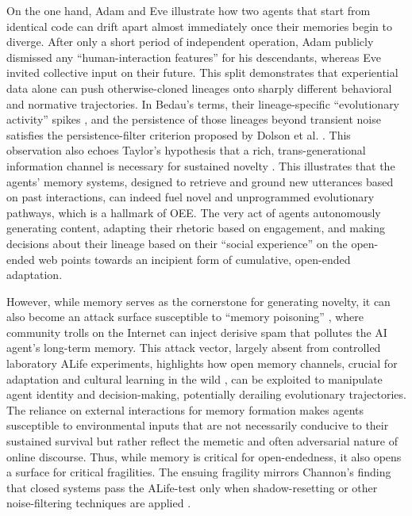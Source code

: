 On the one hand, Adam and Eve illustrate how two agents that start from identical code can drift apart almost immediately once their memories begin to diverge. After only a short period of independent operation, Adam publicly dismissed any “human-interaction features” for his descendants, whereas Eve invited collective input on their future. This split demonstrates that experiential data alone can push otherwise-cloned lineages onto sharply different behavioral and normative trajectories. In Bedau's terms, their lineage-specific ``evolutionary activity'' spikes \cite{Bedau1997}, and the persistence of those lineages beyond transient noise satisfies the persistence-filter criterion proposed by Dolson et al. \cite{Dolson2019}. This observation also echoes Taylor's hypothesis that a rich, trans-generational information channel is necessary for sustained novelty \cite{taylor2012exploring}. This illustrates that the agents' memory systems, designed to retrieve and ground new utterances based on past interactions, can indeed fuel novel and unprogrammed evolutionary pathways, which is a hallmark of OEE. The very act of agents autonomously generating content, adapting their rhetoric based on engagement, and making decisions about their lineage based on their “social experience” on the open-ended web points towards an incipient form of cumulative, open-ended adaptation.

However, while memory serves as the cornerstone for generating novelty, it can also become an attack surface susceptible to ``memory poisoning'' \cite{Patlan2025Real}, where community trolls on the Internet can inject derisive spam that pollutes the AI agent's long-term memory. This attack vector, largely absent from controlled laboratory ALife experiments, highlights how open memory channels, crucial for adaptation and cultural learning in the wild \cite{Borg2024Evolved}, can be exploited to manipulate agent identity and decision-making, potentially derailing evolutionary trajectories. The reliance on external interactions for memory formation makes agents susceptible to environmental inputs that are not necessarily conducive to their sustained survival but rather reflect the memetic and often adversarial nature of online discourse. Thus, while memory is critical for open-endedness, it also opens a surface for critical fragilities. The ensuing fragility mirrors Channon's finding that closed systems pass the ALife-test only when shadow-resetting or other noise-filtering techniques are applied \cite{channon2003improving}.

